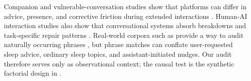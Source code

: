 Companion and vulnerable-conversation studies show that platforms can differ in advice, presence, and corrective friction during extended interactions \cite{chu2026chatbots}. Human-AI interaction studies also show that conversational systems absorb breakdowns and task-specific repair patterns \cite{mahmood2023user}. Real-world corpora such as \wildchat provide a way to audit naturally occurring phrases \cite{wildchat2024}, but phrase matches can conflate user-requested sleep advice, ordinary sleep topics, and assistant-initiated nudges. Our \wildchat audit therefore serves only as observational context; the causal test is the synthetic factorial design in .
